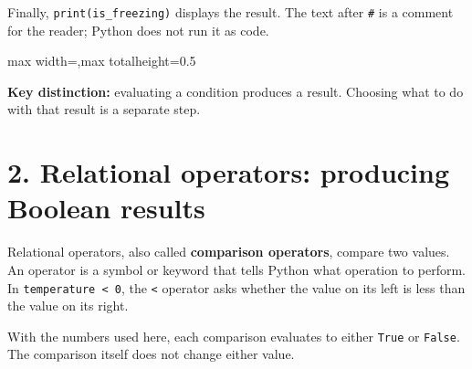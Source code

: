 \documentclass[12pt,a4paper]{article}
\begin{document}
Finally, \texttt{print(is\_freezing)} displays the result. The text after \texttt{\#} is a comment for the reader; Python does not run it as code.

\begin{center}
\begin{adjustbox}{max width=\linewidth,max totalheight=0.5\textheight}
\end{adjustbox}
\end{center}
\textbf{Key distinction:} evaluating a condition produces a result. Choosing what to do with that result is a separate step.

\section*{2. Relational operators: producing Boolean results}
Relational operators, also called \textbf{comparison operators}, compare two values. An operator is a symbol or keyword that tells Python what operation to perform. In \texttt{temperature < 0}, the \texttt{<} operator asks whether the value on its left is less than the value on its right.

With the numbers used here, each comparison evaluates to either \texttt{True} or \texttt{False}. The comparison itself does not change either value.
\end{document}

